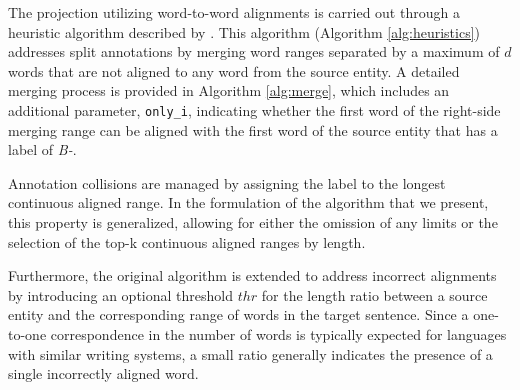 The projection utilizing word-to-word alignments is carried out through a heuristic algorithm described
by \cite{garcia-ferrero-etal-2022-model}. This algorithm (Algorithm \ref{alg:heuristics}) addresses
split annotations by merging word ranges separated by a maximum of \( d \) words that are not aligned
to any word from the source entity. A detailed merging process is provided in Algorithm \ref{alg:merge},
which includes an additional parameter, \texttt{only\_i}, indicating whether the first word of the
right-side merging range can be aligned with the first word of the source entity that has a label
of \textit{B-}.

Annotation collisions are managed by assigning the label to the longest continuous aligned range.
In the formulation of the algorithm that we present, this property is generalized, allowing for either the omission of
any limits or the selection of the top-k continuous aligned ranges by length.

Furthermore, the original algorithm is extended to address incorrect alignments by introducing an
optional threshold \( thr \) for the length ratio between a source entity and the corresponding range of words
in the target sentence. Since a one-to-one correspondence in the number of words is typically expected
for languages with similar writing systems, a small ratio generally indicates the presence of a single
incorrectly aligned word.

